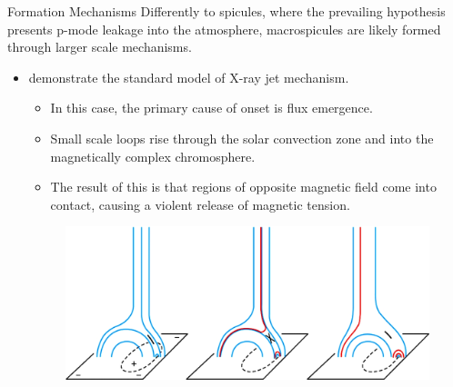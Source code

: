 \documentclass{beamer}
\begin{document}
	\begin{frame}{Formation Mechanisms}
		Differently to spicules, where the prevailing hypothesis presents p-mode leakage into the atmosphere, macrospicules are likely formed through larger scale mechanisms.
		\begin{itemize}
			\item{\cite{Shibata1992} demonstrate the standard model of X-ray jet mechanism.}
			\begin{itemize}
				\item{In this case, the primary cause of onset is flux emergence.}
				\item{Small scale loops rise through the solar convection zone and into the magnetically complex chromosphere.}
				\item{The result of this is that regions of opposite magnetic field come into contact, causing a violent release of magnetic tension.}
			\end{itemize}
			\begin{figure}
				\includegraphics[scale=0.2]{"Figs/inverted_Y.jpg"}		\caption{\cite{Moore2010}}
			\end{figure}
		\end{itemize}
	\end{frame}
\end{document}
